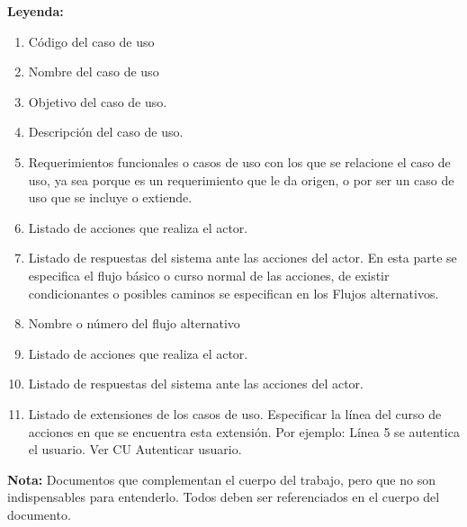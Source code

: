 {\bf Leyenda:}
\begin{enumerate}
 \item Código del caso de uso
 \item Nombre del caso de uso
 \item Objetivo del caso de uso.
 \item Descripción del caso de uso.
 \item Requerimientos funcionales o casos de uso con los que se relacione el caso de uso, ya sea porque es un requerimiento que le da origen, o por ser un caso de uso que se incluye o extiende.
 \item Listado de acciones que realiza el actor.
 \item Listado de respuestas del sistema ante las acciones del actor. {En esta parte se especifica el flujo básico o curso normal de las acciones, de existir condicionantes o posibles caminos se especifican en los Flujos alternativos.}
 \item Nombre o número del flujo alternativo
 \item Listado de acciones que realiza el actor.
 \item Listado de respuestas del sistema ante las acciones del actor.
 \item Listado de extensiones de los casos de uso. Especificar la línea del curso de acciones en que se encuentra esta extensión. Por ejemplo:
Línea 5 se autentica el usuario. Ver CU Autenticar usuario.
\end{enumerate}


 {\bf Nota:} Documentos que complementan el cuerpo del trabajo, pero que no son indispensables para 
entenderlo. Todos deben ser referenciados en el cuerpo del documento.



